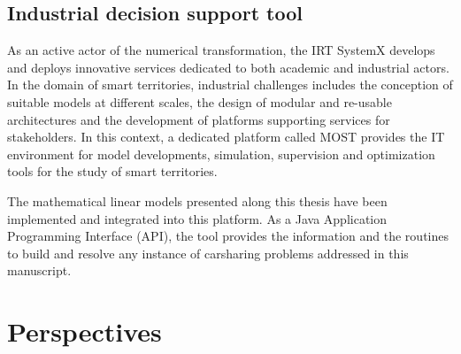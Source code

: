 

\subsection{Industrial decision support tool}

As an active actor of the numerical transformation, the IRT SystemX develops and deploys innovative services dedicated to both academic and industrial actors.
In the domain of smart territories, industrial challenges includes the conception of suitable models at different scales, the design of modular and re-usable architectures and the development of platforms supporting services for stakeholders.
In this context, a dedicated platform called MOST provides the IT environment for model developments, simulation, supervision and optimization tools for the study of smart territories.

The mathematical linear models presented along this thesis have been implemented and integrated into this platform.
As a Java Application Programming Interface (API), the tool provides the information and the routines to build and resolve any instance of carsharing problems addressed in this manuscript.








\section{Perspectives}









